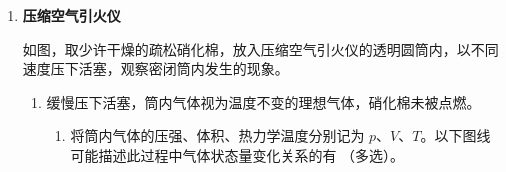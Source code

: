 \documentclass[\gkver]{gaokaozhenti}
\begin{document}
\begin{enumerate}
{（2）由法拉第电磁感应定律 $E=N\frac{\Delta\Phi}{\Delta t}$ 可知，当 $\frac{\Delta\Phi}{\Delta t}$ 最大时感应电动势最大，对应 $\Phi-t$ 图像上切线斜率最大的位置，图中 $t=1.9 \UmsT$ 对应的点符合这个特点。在图中作该点的切线，估算此切线的斜率

\[
k_{\max}=\left(\frac{\Delta\Phi}{\Delta t}\right)_{\max}=\frac{1.100-0.900}{2.54-1.26} \UuWb/\UmsT
\]

\onepicture[w=12.49cm]{}

最大电动势

\[
E=Nk_{\max}=500\times\frac{1.100-0.900}{2.54-1.26}\times10^{-3} \UV \approx 0.0781 \UV
\]

\textbf{另解}：注意：此题并没有说明此曲线为正（余）弦函数曲线，因此下面的方法是不严密的，也不是出卷人预想的方法。

由图可知磁通量随时间的变化关系是 $\Phi=1.00-0.095\times10^{-6}\sin\omega t$，其中角频率

\[
\omega=\frac{2\pi}{T}=\frac{2\times3.14}{3.8\times10^{-3}} \Urads=1653 \Urads
\]

对上式求导得磁通量变化率的大小

\[
\frac{\Delta\Phi}{\Delta t}=0.095\times10^{-6}\omega\cos\omega t
\]

对应的最大值为 $0.095\times10^{-6}\omega$。

由法拉第电磁感应定律 $E=N\frac{\Delta\Phi}{\Delta t}$ 得

\[
E_{m}=500\times0.095\times10^{-6}\times1653 \UV \approx 0.0785 \UV
\]
}

\item
\textbf{压缩空气引火仪}

如图，取少许干燥的疏松硝化棉，放入压缩空气引火仪的透明圆筒内，以不同速度压下活塞，观察密闭筒内发生的现象。

\onepicture[align=right, h=4.50cm]{}
\begin{enumerate}
	\item
	缓慢压下活塞，筒内气体视为温度不变的理想气体，硝化棉未被点燃。

	\begin{enumerate}
		\item
		将筒内气体的压强、体积、热力学温度分别记为 $p$、$V$、$T$。以下图线可能描述此过程中气体状态量变化关系的有 （多选）。

		\onepicture[align=right, w=13.00cm]{}


\end{enumerate}
\end{enumerate}
\end{enumerate}
\end{document}
